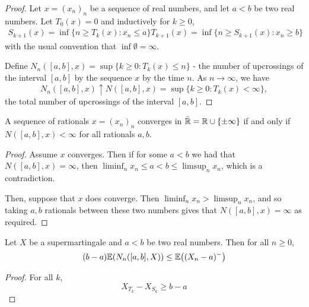 \begin{proof}
  Let $x = (x_{n})_{n}$ be a sequence of real numbers, and let $a < b$
  be two real numbers.  Let $T_{0}(x) = 0$ and inductively for $k \geq
  0$,
  \begin{align}
    \label{eq:37}
    S_{k+1}(x) = \inf \{ n \geq T_{k}(x): x_{n} \leq a \}
    T_{k+1}(x) = \inf \{ n \geq S_{k+1}(x): x_{n} \geq b \}
  \end{align} with the usual convention that $\inf \emptyset =
  \infty$.

  Define $N_{n}([a, b], x) = \sup \{ k \geq 0 : T_{k}(x) \leq n \}$ -
  the number of upcrossings of the interval $[a, b]$ by the sequence
  $x$ by the time $n$. As $n \rightarrow \infty$, we have
  \begin{equation}
    \label{eq:38}
    N_{n}([a,b], x) \uparrow N([a, b], x) = \sup \{ k \geq 0 :
    T_{k}(x) < \infty \}, 
  \end{equation} the total number of upcrossings of the interval $[a, b]$.
\end{proof}

\begin{lem}
  A sequence of rationals $x = (x_{n})_{n}$ converges in $\bar {\mathbb{R}} = \mathbb{R}
  \cup \{ \pm \infty \}$ if and only if $N([a, b], x) < \infty$ for
  all rationals $a, b$.
\end{lem}

\begin{proof}
  Assume $x$ converges.  Then if for some $a < b$ we had that
  $N([a,b], x) = \infty$, then $\liminf_{n} x_{n} \leq a < b \leq
  \limsup_{n} x_{n}$, which is a contradiction.

  Then, suppose that $x$ does converge.  Then $\liminf_{n} x_{n} >
  \limsup_{n} x_{n}$, and so taking $a, b$ rationals between these two
  numbers gives that $N([a,b], x) = \infty$ as required.
\end{proof}

\begin{thm}
  \label{defn:discrete_time_martingales:10}
  Let $X$ be a supermartingale and $a < b$ be two real numbers. Then
  for all $n \geq 0$,
  \begin{equation}
    \label{eq:39}
    (b-a) \E{N_{n}([a, b], X)} \leq \E{(X_{n} - a)^{-}}
  \end{equation}
\end{thm}

\begin{proof}
  For all $k$,
  \begin{equation}
    \label{eq:40}
    X_{T_{k}} - X_{S_{k}} \geq b - a
  \end{equation}
\end{proof}

